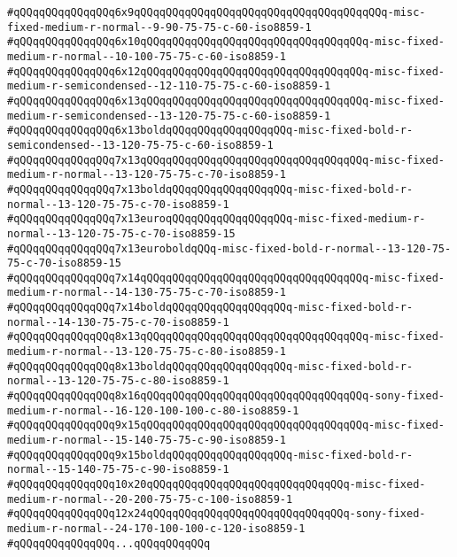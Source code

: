 \verb|#qQQqqQQqqQQqqQQq6x9qQQqqQQqqQQqqQQqqQQqqQQqqQQqqQQqqQQqqQQq-misc-fixed-medium-r-normal--9-90-75-75-c-60-iso8859-1|\newline
\verb|#qQQqqQQqqQQqqQQq6x10qQQqqQQqqQQqqQQqqQQqqQQqqQQqqQQqqQQq-misc-fixed-medium-r-normal--10-100-75-75-c-60-iso8859-1|\newline
\verb|#qQQqqQQqqQQqqQQq6x12qQQqqQQqqQQqqQQqqQQqqQQqqQQqqQQqqQQq-misc-fixed-medium-r-semicondensed--12-110-75-75-c-60-iso8859-1|\newline
\verb|#qQQqqQQqqQQqqQQq6x13qQQqqQQqqQQqqQQqqQQqqQQqqQQqqQQqqQQq-misc-fixed-medium-r-semicondensed--13-120-75-75-c-60-iso8859-1|\newline
\verb|#qQQqqQQqqQQqqQQq6x13boldqQQqqQQqqQQqqQQqqQQq-misc-fixed-bold-r-semicondensed--13-120-75-75-c-60-iso8859-1|\newline
\verb|#qQQqqQQqqQQqqQQq7x13qQQqqQQqqQQqqQQqqQQqqQQqqQQqqQQqqQQq-misc-fixed-medium-r-normal--13-120-75-75-c-70-iso8859-1|\newline
\verb|#qQQqqQQqqQQqqQQq7x13boldqQQqqQQqqQQqqQQqqQQq-misc-fixed-bold-r-normal--13-120-75-75-c-70-iso8859-1|\newline
\verb|#qQQqqQQqqQQqqQQq7x13euroqQQqqQQqqQQqqQQqqQQq-misc-fixed-medium-r-normal--13-120-75-75-c-70-iso8859-15|\newline
\verb|#qQQqqQQqqQQqqQQq7x13euroboldqQQq-misc-fixed-bold-r-normal--13-120-75-75-c-70-iso8859-15|\newline
\verb|#qQQqqQQqqQQqqQQq7x14qQQqqQQqqQQqqQQqqQQqqQQqqQQqqQQqqQQq-misc-fixed-medium-r-normal--14-130-75-75-c-70-iso8859-1|\newline
\verb|#qQQqqQQqqQQqqQQq7x14boldqQQqqQQqqQQqqQQqqQQq-misc-fixed-bold-r-normal--14-130-75-75-c-70-iso8859-1|\newline
\verb|#qQQqqQQqqQQqqQQq8x13qQQqqQQqqQQqqQQqqQQqqQQqqQQqqQQqqQQq-misc-fixed-medium-r-normal--13-120-75-75-c-80-iso8859-1|\newline
\verb|#qQQqqQQqqQQqqQQq8x13boldqQQqqQQqqQQqqQQqqQQq-misc-fixed-bold-r-normal--13-120-75-75-c-80-iso8859-1|\newline
\verb|#qQQqqQQqqQQqqQQq8x16qQQqqQQqqQQqqQQqqQQqqQQqqQQqqQQqqQQq-sony-fixed-medium-r-normal--16-120-100-100-c-80-iso8859-1|\newline
\verb|#qQQqqQQqqQQqqQQq9x15qQQqqQQqqQQqqQQqqQQqqQQqqQQqqQQqqQQq-misc-fixed-medium-r-normal--15-140-75-75-c-90-iso8859-1|\newline
\verb|#qQQqqQQqqQQqqQQq9x15boldqQQqqQQqqQQqqQQqqQQq-misc-fixed-bold-r-normal--15-140-75-75-c-90-iso8859-1|\newline
\verb|#qQQqqQQqqQQqqQQq10x20qQQqqQQqqQQqqQQqqQQqqQQqqQQqqQQq-misc-fixed-medium-r-normal--20-200-75-75-c-100-iso8859-1|\newline
\verb|#qQQqqQQqqQQqqQQq12x24qQQqqQQqqQQqqQQqqQQqqQQqqQQqqQQq-sony-fixed-medium-r-normal--24-170-100-100-c-120-iso8859-1|\newline
\verb|#qQQqqQQqqQQqqQQq...qQQqqQQqqQQq|\newline

